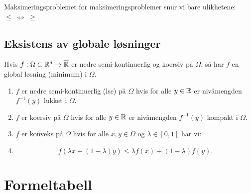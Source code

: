 \begin{remark}{Maksimeringsproblemet}{}
  for maksimeringsproblemer snur vi bare ulikhetene: \(\leq \; \Leftrightarrow \; \geq\).
\end{remark}

\section*{Eksistens av globale løsninger}

Hvis \(f: \Omega \subset \mathbb{R}^d \to \overline{\mathbb{R}}\) er nedre semi-kontinuerlig og koersiv på \(\Omega\), så har \(f\) en global løsning (minimum) i \(\Omega\).

\begin{enumerate}
  \item \(f\) er nedre semi-kontinuerlig (lsc) på \(\Omega\) hvis for alle \(y \in \mathbb{R}\) er nivåmengden \(f^{-1}(y)\) lukket i \(\Omega\).
  \item \(f\) er koersiv på \(\Omega\) hvis for alle \(y \in \mathbb{R}\) er nivåmengden \(f^{-1}(y)\) kompakt i \(\Omega\).
  \item \(f\) er konveks på \(\Omega\) hvis for alle \(x, y \in \Omega\) og \(\lambda \in [0, 1]\) har vi:
  \item
        \[
          f(\lambda x + (1 - \lambda)y) \leq \lambda f(x) + (1 - \lambda)f(y).
        \]
\end{enumerate}

\chapter{Formeltabell}

